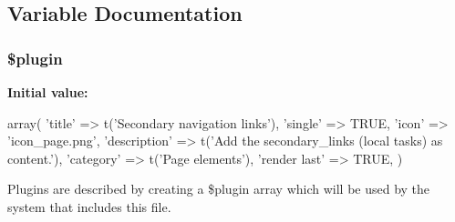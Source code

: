 \subsection{Variable Documentation}
\hypertarget{page__secondary__links_8inc_ada8a7130088351710bb02ed622d6bf65}{
\subsubsection[{\$plugin}]{\setlength{\rightskip}{0pt plus 5cm}\$plugin}}
\label{page__secondary__links_8inc_ada8a7130088351710bb02ed622d6bf65}
{\bfseries Initial value:}
\begin{DoxyCode}
 array(
  'title' => t('Secondary navigation links'),
  'single' => TRUE,
  'icon' => 'icon_page.png',
  'description' => t('Add the secondary_links (local tasks) as content.'),
  'category' => t('Page elements'),
  'render last' => TRUE,
)
\end{DoxyCode}
Plugins are described by creating a \$plugin array which will be used by the system that includes this file. 